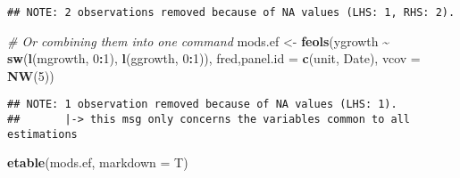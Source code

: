 \documentclass[
]{article}
\newenvironment{Shaded}{\begin{snugshade}}{\end{snugshade}}
\newcommand{\AttributeTok}[1]{\textcolor[rgb]{0.13,0.29,0.53}{#1}}
\newcommand{\CommentTok}[1]{\textcolor[rgb]{0.56,0.35,0.01}{\textit{#1}}}
\newcommand{\DecValTok}[1]{\textcolor[rgb]{0.00,0.00,0.81}{#1}}
\newcommand{\FunctionTok}[1]{\textcolor[rgb]{0.13,0.29,0.53}{\textbf{#1}}}
\newcommand{\NormalTok}[1]{#1}
\newcommand{\OtherTok}[1]{\textcolor[rgb]{0.56,0.35,0.01}{#1}}
\newcommand{\SpecialCharTok}[1]{\textcolor[rgb]{0.81,0.36,0.00}{\textbf{#1}}}
\newcommand{\StringTok}[1]{\textcolor[rgb]{0.31,0.60,0.02}{#1}}
\begin{document}
\begin{verbatim}
## NOTE: 2 observations removed because of NA values (LHS: 1, RHS: 2).
\end{verbatim}

\begin{Shaded}
\begin{Highlighting}[]
\CommentTok{\# Or combining them into one command}
\NormalTok{mods.ef }\OtherTok{\textless{}{-}} \FunctionTok{feols}\NormalTok{(ygrowth }\SpecialCharTok{\textasciitilde{}} \FunctionTok{sw}\NormalTok{(}\FunctionTok{l}\NormalTok{(mgrowth, }\DecValTok{0}\SpecialCharTok{:}\DecValTok{1}\NormalTok{),}
                                 \FunctionTok{l}\NormalTok{(ggrowth, }\DecValTok{0}\SpecialCharTok{:}\DecValTok{1}\NormalTok{)),}
\NormalTok{                 fred,}\AttributeTok{panel.id =} \FunctionTok{c}\NormalTok{(}\StringTok{\textquotesingle{}unit\textquotesingle{}}\NormalTok{, }\StringTok{\textquotesingle{}Date\textquotesingle{}}\NormalTok{),}
                 \AttributeTok{vcov =} \FunctionTok{NW}\NormalTok{(}\DecValTok{5}\NormalTok{))}
\end{Highlighting}
\end{Shaded}

\begin{verbatim}
## NOTE: 1 observation removed because of NA values (LHS: 1).
##       |-> this msg only concerns the variables common to all estimations
\end{verbatim}

\begin{Shaded}
\begin{Highlighting}[]
\FunctionTok{etable}\NormalTok{(mods.ef, }\AttributeTok{markdown =}\NormalTok{ T)}
\end{Highlighting}
\end{Shaded}
\end{document}
